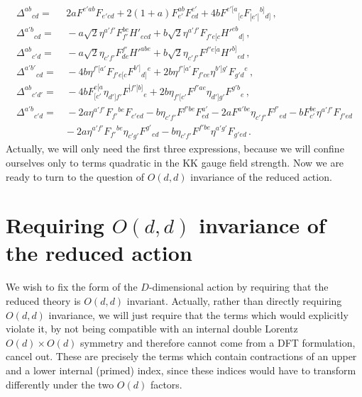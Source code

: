 \documentclass[a4paper,11pt]{article}
\begin{document}
\begin{equation}
\begin{aligned}
\Delta^{ab}{}_{cd}=&\,
2aF^{e'ab}F_{e'cd}
+2(1+a)F_{e'}^{ab}F^{e'}_{cd}
+4bF^{e'[a}{}_{[c}F_{|e'|}{}^{b]}{}_{d]}\,,
\\
\Delta^{a'b}{}_{cd}
=&\,
-a\sqrt2\eta^{a'f'}F_{f'}^{be}H'_{ecd}
+b\sqrt2\eta^{a'f'}F_{f'e[c}H'^{eb}{}_{d]}\,,
\\
\Delta^{ab}{}_{c'd}
=&\,
-a\sqrt2\eta_{c'f'}F^{f'}_{de}H'^{abe}
+b\sqrt2\eta_{c'f'}F^{f'e[a}H'^{b]}{}_{ed}\,,
\\
\Delta^{a'b'}{}_{cd}
=&\,
-4b\eta^{f'[a'}F_{f'e[c}F^{b']}{}_{d]}{}^e
+2b\eta^{f'[a'}F_{f'ce}\eta^{b']g'}F_{g'd}{}^e\,,
\\
\Delta^{ab}{}_{c'd'}
=&\,
-4bF_{[c'}^{e[a}\eta_{d']f'}F^{|f'|b]}{}_e
+2b\eta_{f'[c'}F^{f'ae}\eta_{d']g'}F^{g'b}{}_e\,,
\\
\Delta^{a'b}{}_{c'd}
=&\,
-2a\eta^{a'f'}F_{f'}{}^{be}F_{c'ed}
-b\eta_{c'f'}F^{f'be}F^{a'}_{ed}
-2aF^{a'be}\eta_{c'f'}F^{f'}{}_{ed}
-bF_{c'}^{be}\eta^{a'f'}F_{f'ed}
\\
&{}
-2a\eta^{a'f'}F_{f'}{}^{be}\eta_{c'g'}F^{g'}{}_{ed}
-b\eta_{c'f'}F^{f'be}\eta^{a'g'}F_{g'ed}\,.
\end{aligned}
\label{eq:Deltas}
\end{equation}
Actually, we will only need the first three expressions, because we will confine ourselves only to terms quadratic in the KK gauge field strength. Now we are ready to turn to the question of $O(d,d)$ invariance of the reduced action.


\section{Requiring \texorpdfstring{$O(d,d)$}{O(d,d)} invariance of the reduced action}\label{sec:Odd}
We wish to fix the form of the $D$-dimensional action by requiring that the reduced theory is $O(d,d)$ invariant. Actually, rather than directly requiring $O(d,d)$ invariance, we will just require that the terms which would explicitly violate it, by not being compatible with an internal double Lorentz $O(d)\times O(d)$ symmetry and therefore cannot come from a DFT formulation, cancel out. These are precisely the terms which contain contractions of an upper and a lower internal (primed) index, since these indices would have to transform differently under the two $O(d)$ factors. 
\end{document}
